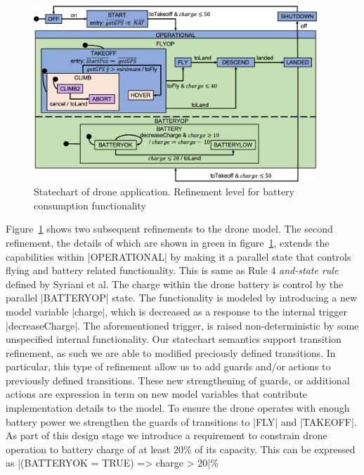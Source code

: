 \begin{figure}[!h]
	\centering
	\includegraphics[width=0.95\textwidth]{figures/Picture5.png}
	\caption{Statechart of drone application. Refinement level for battery consumption functionality}
	\label{fig:drone4}
\end{figure} 

Figure~\ref{fig:drone4} shows two subsequent refinements to the drone model.
The second refinement, the details of which are shown in green in figure~\ref{fig:drone4}, 
extends the capabilities within |OPERATIONAL| by making it a parallel
state that controls flying and battery related functionality. 
This is same as Rule 4 \emph{and-state rule} defined by Syriani et al.
The charge within the drone battery is control by the parallel |BATTERYOP| state. 
The functionality is modeled by introducing a new model variable |charge|, which is decreased as 
a response to the internal trigger |decreaseCharge|. The aforementioned trigger, is raised non-deterministic by some 
unspecified internal functionality. Our statechart semantics support transition refinement, as such
we are able to modified preciously defined transitions. In particular, this type of refinement allow
us to add guards and/or actions to previously defined transitions. These new strengthening of guards, or additional 
actions are expression in term on new model variables that contribute implementation details to the model.
To ensure the drone operates with enough battery power we strengthen the guards of transitions to |FLY| and |TAKEOFF|.
As part of this design stage we introduce a requirement to constrain drone operation to battery charge of 
at least 20\% of its capacity. This can be expressed as |(BATTERYOK = TRUE) => charge > 20|\%

